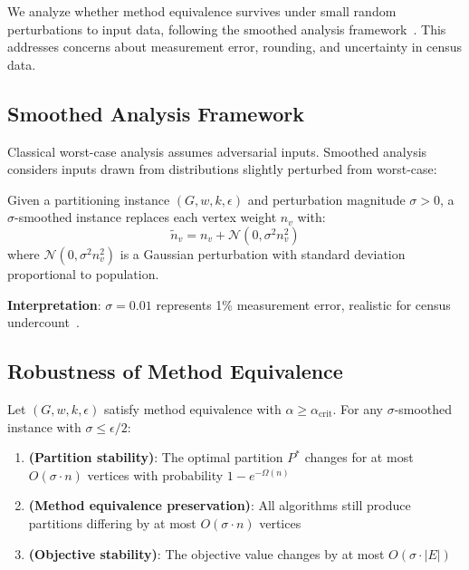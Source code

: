 
We analyze whether method equivalence survives under small random perturbations to input data, following the smoothed analysis framework~\cite{spielman2004smoothed,spielman2011smoothed}. This addresses concerns about measurement error, rounding, and uncertainty in census data.

\subsection{Smoothed Analysis Framework}

Classical worst-case analysis assumes adversarial inputs. Smoothed analysis~\cite{spielman2004smoothed} considers inputs drawn from distributions slightly perturbed from worst-case:

\begin{definition}
Given a partitioning instance $(G, w, k, \epsilon)$ and perturbation magnitude $\sigma > 0$, a $\sigma$-smoothed instance replaces each vertex weight $n_v$ with:
\[
\tilde{n}_v = n_v + \mathcal{N}(0, \sigma^2 n_v^2)
\]
where $\mathcal{N}(0, \sigma^2 n_v^2)$ is a Gaussian perturbation with standard deviation proportional to population.
\end{definition}

\textbf{Interpretation}: $\sigma = 0.01$ represents 1\% measurement error, realistic for census undercount~\cite{census2020undercount}.

\subsection{Robustness of Method Equivalence}

\begin{theorem}
\label{thm:smoothed}
Let $(G, w, k, \epsilon)$ satisfy method equivalence with $\alpha \geq \alpha_{\text{crit}}$. For any $\sigma$-smoothed instance with $\sigma \leq \epsilon / 2$:

\begin{enumerate}
    \item \textbf{(Partition stability)}: The optimal partition $P^*$ changes for at most $O(\sigma \cdot n)$ vertices with probability $1 - e^{-\Omega(n)}$

    \item \textbf{(Method equivalence preservation)}: All algorithms still produce partitions differing by at most $O(\sigma \cdot n)$ vertices

    \item \textbf{(Objective stability)}: The objective value changes by at most $O(\sigma \cdot |E|)$
\end{enumerate}
\end{theorem}

